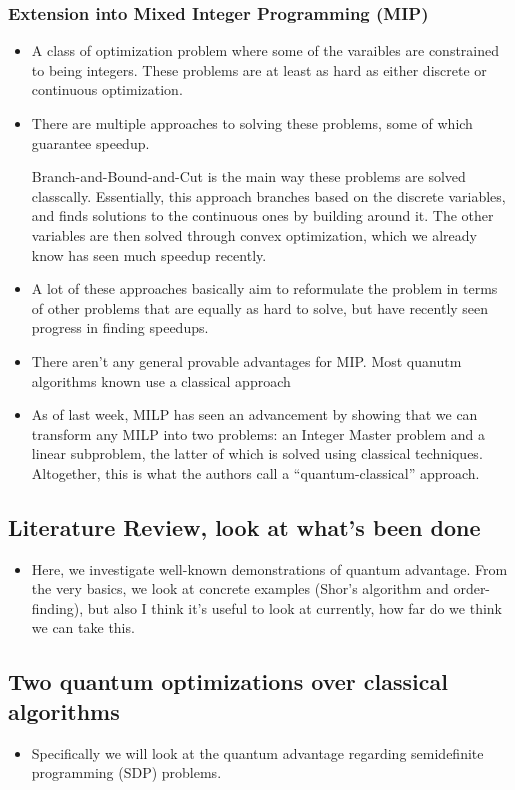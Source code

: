 \documentclass[10pt]{article}
\begin{document}
	\subsubsection{Extension into Mixed Integer Programming (MIP)}
	\begin{itemize}
		\item A class of optimization problem where some of the varaibles are constrained 
			to being integers. These problems are at least as hard as either discrete or continuous optimization.  
		\item There are multiple approaches to solving these problems, some of which guarantee speedup. 

			Branch-and-Bound-and-Cut is the main way these problems are solved classcally. Essentially, this approach
			branches based on the discrete variables, and finds solutions to the continuous ones by 
			building around it. The other variables are then solved through convex optimization, which we already 
			know has seen much speedup recently. 
		\item A lot of these approaches basically aim to reformulate the problem in terms of other problems
			that are equally as hard to solve, but have recently seen progress in finding speedups.  
		\item There aren't any general provable advantages for MIP. Most quanutm algorithms known use a classical 
			approach
		\item As of last week, MILP has seen an advancement by showing that we can transform any MILP into two problems:
			an Integer Master problem and a linear subproblem, the latter of which is solved using classical 
			techniques. Altogether, this is what the authors call a ``quantum-classical'' approach. 
	\end{itemize}
	\subsection{Literature Review, look at what's been done}

	\begin{itemize}
		\item Here, we investigate well-known demonstrations of quantum advantage. From the very basics, we look at 
			concrete examples (Shor's algorithm and order-finding), but also I think it's useful to look at 
			currently, how far do we think we can take this.  
	\end{itemize}
	\subsection{Two quantum optimizations over classical algorithms}
	\begin{itemize}
		\item Specifically we will look at the quantum advantage regarding semidefinite programming (SDP) problems. 
	\end{itemize}
\end{document}
